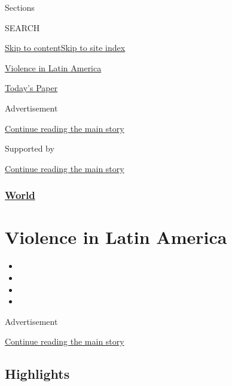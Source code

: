 Sections

SEARCH

\protect\hyperlink{site-content}{Skip to
content}\protect\hyperlink{site-index}{Skip to site index}

\href{https://www.nytimes3xbfgragh.onion/spotlight/violence-in-latin-america}{Violence
in Latin America}

\href{https://myaccount.nytimes3xbfgragh.onion/auth/login?response_type=cookie\&client_id=vi}{}

\href{https://www.nytimes3xbfgragh.onion/section/todayspaper}{Today's
Paper}

Advertisement

\protect\hyperlink{after-top}{Continue reading the main story}

Supported by

\protect\hyperlink{after-sponsor}{Continue reading the main story}

\hypertarget{world}{%
\subsubsection{\texorpdfstring{\href{/section/world}{World}}{World}}\label{world}}

\hypertarget{violence-in-latin-america}{%
\section{Violence in Latin America}\label{violence-in-latin-america}}

\begin{itemize}
\item
\item
\item
\item
\end{itemize}

Advertisement

\protect\hyperlink{after-subheader}{Continue reading the main story}

\hypertarget{highlights}{%
\subsection{Highlights}\label{highlights}}

